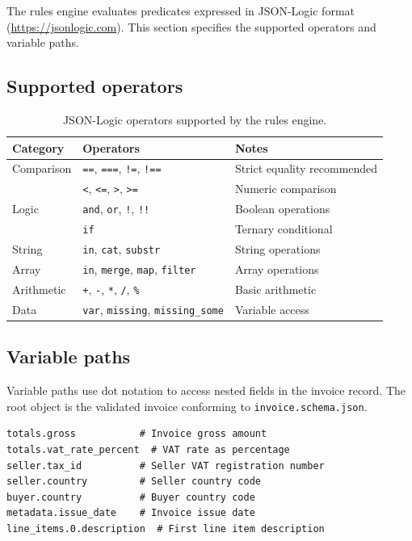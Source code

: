 The rules engine evaluates predicates expressed in JSON-Logic format
(\url{https://jsonlogic.com}). This section specifies the supported
operators and variable paths.

\subsection{Supported operators}

\begin{table}[htbp]
\centering
\caption{JSON-Logic operators supported by the rules engine.}
\label{tab:jsonlogic-ops}
\footnotesize
\begin{tabularx}{\linewidth}{@{}l l X@{}}
\toprule
\textbf{Category} & \textbf{Operators} & \textbf{Notes} \\ \midrule
Comparison & \texttt{==}, \texttt{===}, \texttt{!=}, \texttt{!==} & Strict equality recommended \\
           & \texttt{<}, \texttt{<=}, \texttt{>}, \texttt{>=} & Numeric comparison \\
Logic      & \texttt{and}, \texttt{or}, \texttt{!}, \texttt{!!} & Boolean operations \\
           & \texttt{if} & Ternary conditional \\
String     & \texttt{in}, \texttt{cat}, \texttt{substr} & String operations \\
Array      & \texttt{in}, \texttt{merge}, \texttt{map}, \texttt{filter} & Array operations \\
Arithmetic & \texttt{+}, \texttt{-}, \texttt{*}, \texttt{/}, \texttt{\%} & Basic arithmetic \\
Data       & \texttt{var}, \texttt{missing}, \texttt{missing\_some} & Variable access \\
\bottomrule
\end{tabularx}
\end{table}

\subsection{Variable paths}

Variable paths use dot notation to access nested fields in the invoice record.
The root object is the validated invoice conforming to
\texttt{invoice.schema.json}.

\begin{lstlisting}[basicstyle=\ttfamily\small,caption={Example variable paths for invoice data.}]
totals.gross           # Invoice gross amount
totals.vat_rate_percent  # VAT rate as percentage
seller.tax_id          # Seller VAT registration number
seller.country         # Seller country code
buyer.country          # Buyer country code
metadata.issue_date    # Invoice issue date
line_items.0.description  # First line item description
\end{lstlisting}

